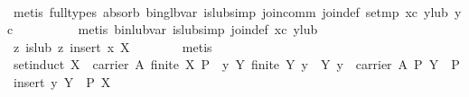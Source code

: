 \begin{isabellebody}
\ \ \ \ \ \ \ \ \isamarkupfalse%
\ {}metis\ {}full{}types{}\ absorb{}\ bin{}glb{}var\ is{}lub{}simp\ join{}comm\ join{}def\ set{}mp\ xc\ y{}lub\ yc{}\isanewline
\ \ \ \ \ \ \ \ \isamarkupfalse%
\ {}metis\ bin{}lub{}var\ is{}lub{}simp\ join{}def\ xc\ y{}lub{}\isanewline
\ \ \ \ \isamarkupfalse%
\isanewline
\ \ \ \ \isamarkupfalse%
\ {}{}z{}\ is{}lub\ z\ {}insert\ x\ X{}{}\isanewline
\ \ \ \ \ \ \isamarkupfalse%
\ metis\isanewline
\ \ \isamarkupfalse%
%
\endisatagproof
{\isafoldproof}%
%
\isadelimproof
\isanewline
%
\endisadelimproof
\isanewline
\ \ \isamarkupfalse%
\ set{}induct{}\ {}{}X\ {}\ carrier\ A{}\ finite\ X{}\ P\ {}{}{}\ {}y\ Y{}\ {}finite\ Y{}\ y\ {}\ Y{}\ y\ {}\ carrier\ A{}\ P\ Y{}\ {}\ P\ {}insert\ y\ Y{}{}\ {}\ P\ X{}\isanewline

\end{isabellebody}

